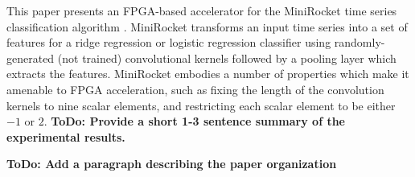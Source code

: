 This paper presents an FPGA-based accelerator for the MiniRocket time series classification algorithm \cite{MiniRocket}. MiniRocket transforms an input time series into a set of features for a ridge regression or logistic regression classifier using randomly-generated (not trained) convolutional kernels followed by a pooling layer which extracts the features. MiniRocket embodies a number of properties which make it amenable to FPGA acceleration, such as fixing the length of the convolution kernels to nine scalar elements, and restricting each scalar element to be either $-1$ or $2$. \textbf{ToDo: Provide a short 1-3 sentence summary of the experimental results.}

\textbf{ToDo: Add a paragraph describing the paper organization}

